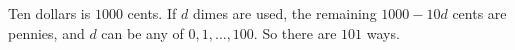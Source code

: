 Ten dollars is $1000$ cents. If $d$ dimes are used, the remaining $1000-10d$ cents are pennies, and $d$ can be any of $0,1,\dots,100$. So there are $\boxed{101}$ ways.
